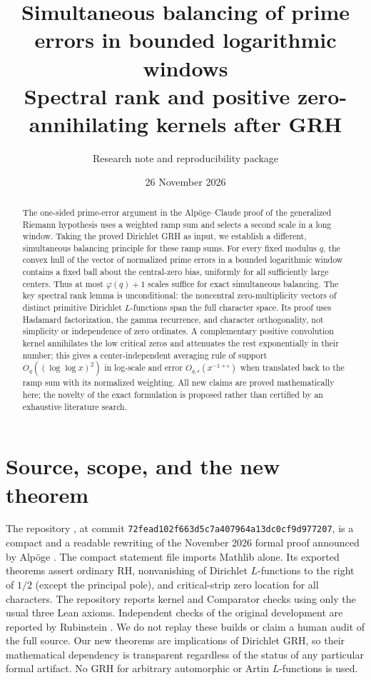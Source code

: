 \documentclass[11pt]{article}
\title{Simultaneous balancing of prime errors in bounded logarithmic windows\\[3pt]\large Spectral rank and positive zero-annihilating kernels after GRH}
\author{Research note and reproducibility package}
\date{26 November 2026}
\theoremstyle{remark}\newtheorem{remark}[theorem]{Remark}
\begin{document}
\maketitle
\begin{abstract}
The one-sided prime-error argument in the Alp\"oge--Claude proof of the generalized Riemann hypothesis uses a weighted ramp sum and selects a second scale in a long window. Taking the proved Dirichlet GRH as input, we establish a different, simultaneous balancing principle for these ramp sums. For every fixed modulus $q$, the convex hull of the vector of normalized prime errors in a bounded logarithmic window contains a fixed ball about the central-zero bias, uniformly for all sufficiently large centers. Thus at most $\varphi(q)+1$ scales suffice for exact simultaneous balancing. The key spectral rank lemma is unconditional: the noncentral zero-multiplicity vectors of distinct primitive Dirichlet $L$-functions span the full character space. Its proof uses Hadamard factorization, the gamma recurrence, and character orthogonality, not simplicity or independence of zero ordinates. A complementary positive convolution kernel annihilates the low critical zeros and attenuates the rest exponentially in their number; this gives a center-independent averaging rule of support $O_q((\log\log x)^2)$ in log-scale and error $O_{q,\epsilon}(x^{-1+\epsilon})$ when translated back to the ramp sum with its normalized weighting. All new claims are proved mathematically here; the novelty of the exact formulation is proposed rather than certified by an exhaustive literature search.
\end{abstract}

\section{Source, scope, and the new theorem}
The repository \cite{repo}, at commit \texttt{72fead102f663d5c7a407964a13dc0cf9d977207}, is a compact and a readable rewriting of the November 2026 formal proof announced by Alp\"oge \cite{alpoge}. The compact statement file imports Mathlib alone. Its exported theorems assert ordinary RH, nonvanishing of Dirichlet $L$-functions to the right of $1/2$ (except the principal pole), and critical-strip zero location for all characters. The repository reports kernel and Comparator checks using only the usual three Lean axioms. Independent checks of the original development are reported by Rubinstein \cite{rubinstein}. We do not replay these builds or claim a human audit of the full source. Our new theorems are implications of Dirichlet GRH, so their mathematical dependency is transparent regardless of the status of any particular formal artifact. No GRH for arbitrary automorphic or Artin $L$-functions is used.
\end{document}
